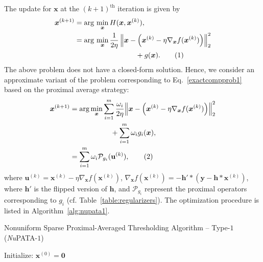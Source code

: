 \documentclass[journal]{IEEEtran}
\newcommand{\argminA}{\arg\,\min}
\newcommand\numberthis{\addtocounter{equation}{1}\tag{\theequation}}
\begin{document}
The update for $\boldsymbol{x}$ at the $(k+1)^{\text{th}}$ iteration is given by 
\begin{align*}
\boldsymbol{x}^{(k+1)} & = \argminA_{\boldsymbol{x}} H(\boldsymbol{x},\boldsymbol{x}^{(k)}), \\
& = \argminA_{\boldsymbol{x}} \frac{1}{2 \eta} \left\|\boldsymbol{x} - \left( \boldsymbol{x}^{(k)}- \eta\nabla_{\boldsymbol{x}} f(\boldsymbol{x}^{(k)}) \right)\right\|_{2}^{2} \\ & \hspace{3cm} + g(\boldsymbol{x}). \numberthis \label{exactcompprob1}
\end{align*}
The above problem does not have a closed-form solution. Hence, we consider an approximate variant of the problem corresponding to Eq.~\eqref{exactcompprob1} based on the proximal average strategy:
\begin{align*}
\boldsymbol{x}^{(k+1)} 
 & = \arg\min_{\boldsymbol{x}} \sum\limits_{i = 1}^m \frac{\omega_{i}}{2 \eta} {\left\| \boldsymbol{x} - \left( \boldsymbol{x}^{(k)}- \eta\nabla_{\boldsymbol{x}} f(\boldsymbol{x}^{(k)}) \right) \right\|}_{2}^{2} \\
  & \hspace{2cm} + \sum\limits_{i = 1}^m { \omega_{i} g_{i}(\boldsymbol{x}) },\\
 & = \sum\limits_{i=1}^m \omega_i \mathcal{P}_{g_i}(\mathbf{u}^{(k)}) , \numberthis \label{nupata1}
\end{align*}
where $\mathbf{u}^{(k)} = \boldsymbol{x}^{(k)}- \eta\nabla_{\boldsymbol{x}} f(\boldsymbol{x}^{(k)})$, $ \nabla_{\boldsymbol{x}} f(\boldsymbol{x}^{(k)}) = - \boldsymbol{h}' * \left( \boldsymbol{y} - \boldsymbol{h} * \boldsymbol{x}^{(k)} \right)$, where $\boldsymbol{h}'$ is the flipped version of $\boldsymbol{h}$, and $\mathcal{P}_{g_i}$ represent the proximal operators corresponding to $g_i$ (cf. Table~\ref{table:regularizers}). The optimization procedure is listed in Algorithm~\ref{alg:nupata1}.

\begin{algorithm}[t]
    \caption{Nonuniform Sparse Proximal-Averaged Thresholding Algorithm -- Type-$1$ ({\it Nu}PATA-$1$)}\label{alg:nupata1}
    Initialize: $ \boldsymbol{x}^{(0)} = \boldsymbol{0} $\;
\end{algorithm}%
\end{document}
